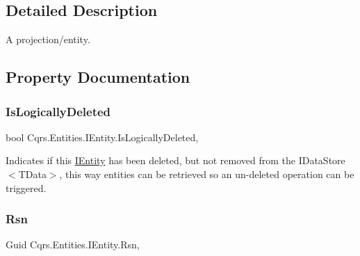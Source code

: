 \subsection{Detailed Description}
A projection/entity. 



\subsection{Property Documentation}
\mbox{\label{interfaceCqrs_1_1Entities_1_1IEntity_a4c682465a1c45a70380c2ca5e9cab15f_a4c682465a1c45a70380c2ca5e9cab15f}} 
\subsubsection{\texorpdfstring{Is\+Logically\+Deleted}{IsLogicallyDeleted}}
{\footnotesize\ttfamily bool Cqrs.\+Entities.\+I\+Entity.\+Is\+Logically\+Deleted\hspace{0.3cm}{\ttfamily [get]}, {\ttfamily [set]}}



Indicates if this \hyperlink{interfaceCqrs_1_1Entities_1_1IEntity}{I\+Entity} has been deleted, but not removed from the I\+Data\+Store$<$\+T\+Data$>$, this way entities can be retrieved so an un-\/deleted operation can be triggered. 

\mbox{\label{interfaceCqrs_1_1Entities_1_1IEntity_af2bfc288bc574712d7f00af608789f8d_af2bfc288bc574712d7f00af608789f8d}} 
\subsubsection{\texorpdfstring{Rsn}{Rsn}}
{\footnotesize\ttfamily Guid Cqrs.\+Entities.\+I\+Entity.\+Rsn\hspace{0.3cm}{\ttfamily [get]}, {\ttfamily [set]}}



